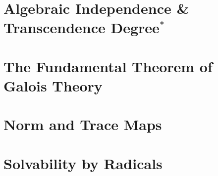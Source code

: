 \documentclass{article}
\begin{document}
\section{Algebraic Independence \& Transcendence Degree$^{\ast}$}

\section{The Fundamental Theorem of Galois Theory}

\section{Norm and Trace Maps}

\section{Solvability by Radicals}
\end{document}
